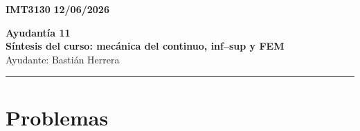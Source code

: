 \documentclass[11pt]{article}
\begin{document}
\begin{flushleft}
    \small
    \textbf{IMT3130} \hfill
    \textbf{12/06/2026}
\end{flushleft}
\begin{center}
    \LARGE\textbf{Ayudant\'ia 11}\\
    \vspace{3pt}
    \normalsize\textbf{S\'intesis del curso: mec\'anica del continuo, inf--sup y FEM}\\
    \normalsize Ayudante: Basti\'an Herrera 
    \rule{\textwidth}{0.05mm}
\end{center}

\section*{Problemas}
\end{document}
